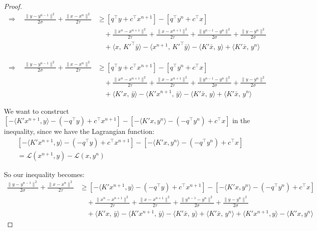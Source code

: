 \documentclass[10pt,a4paper]{amsart}
\begin{document}
\begin{proof}
\[
\begin{aligned}
\Rightarrow \quad
 \frac{\|y - y^{n-1}\|^2}{2\sigma} + \frac{\|x - x^n\|^2}{2\tau} &\geq [q^\top y + c^\top x^{n+1}] - [q^\top y^{n} + c^\top x] \\
& \quad + \frac{\|x^n - x^{n+1}\|^2}{2\tau} + \frac{\|x - x^{n+1}\|^2}{2\tau} + \frac{\|y^{n-1} - y^{n}\|^2}{2\sigma} + \frac{\|y - y^{n}\|^2}{2\sigma} \\
& \quad + \langle x,\, K'^\top \bar{y} \rangle - \langle x^{n+1},\, K'^\top \bar{y} \rangle - \langle K' \bar{x},\, y \rangle + \langle K' \bar{x},\, y^{n} \rangle
\end{aligned}
\]

\[
\begin{aligned}
\Rightarrow \quad
 \frac{\|y - y^{n-1}\|^2}{2\sigma} + \frac{\|x - x^n\|^2}{2\tau} &\geq [q^\top y + c^\top x^{n+1}] - [q^\top y^{n} + c^\top x] \\
& \quad + \frac{\|x^n - x^{n+1}\|^2}{2\tau} + \frac{\|x - x^{n+1}\|^2}{2\tau} + \frac{\|y^{n-1} - y^{n}\|^2}{2\sigma} + \frac{\|y - y^{n}\|^2}{2\sigma} \\
& \quad + \langle K' x,\, \bar{y} \rangle - \langle K' x^{n+1},\, \bar{y} \rangle - \langle K' \bar{x},\, y \rangle + \langle K' \bar{x},\, y^{n} \rangle
\end{aligned}
\]

We want to construct \([-\langle K'x^{n+1},y\rangle - (-q^\top y) + c^\top x^{n+1}] - [-\langle K'x,y^{n}\rangle - (-q^\top y^{n}) + c^\top x] \) in the inequality, since we have the Lagrangian function: 
\[
\begin{aligned}
    &[-\langle K'x^{n+1},y\rangle - (-q^\top y) + c^\top x^{n+1}] - [-\langle K'x,y^{n}\rangle - (-q^\top y^{n}) + c^\top x] \\
    &= \mathcal{L}(x^{n+1},y)-\mathcal{L}(x,y^n)
\end{aligned}
\]

So our inequality becomes:
\[
\begin{aligned}
 \frac{\|y - y^{n-1}\|^2}{2\sigma} + \frac{\|x - x^n\|^2}{2\tau} &\geq [-\langle K'x^{n+1},y\rangle - (-q^\top y) + c^\top x^{n+1}] - [-\langle K'x,y^{n}\rangle - (-q^\top y^{n}) + c^\top x] \\
& \quad + \frac{\|x^n - x^{n+1}\|^2}{2\tau} + \frac{\|x - x^{n+1}\|^2}{2\tau} + \frac{\|y^{n-1} - y^{n}\|^2}{2\sigma} + \frac{\|y - y^{n}\|^2}{2\sigma} \\
& \quad + \langle K' x,\, \bar{y} \rangle - \langle K' x^{n+1},\, \bar{y} \rangle - \langle K' \bar{x},\, y \rangle + \langle K' \bar{x},\, y^{n} \rangle + \langle K'x^{n+1},y\rangle - \langle K'x,y^{n}\rangle
\end{aligned}
\]


\end{proof}
\end{document}
